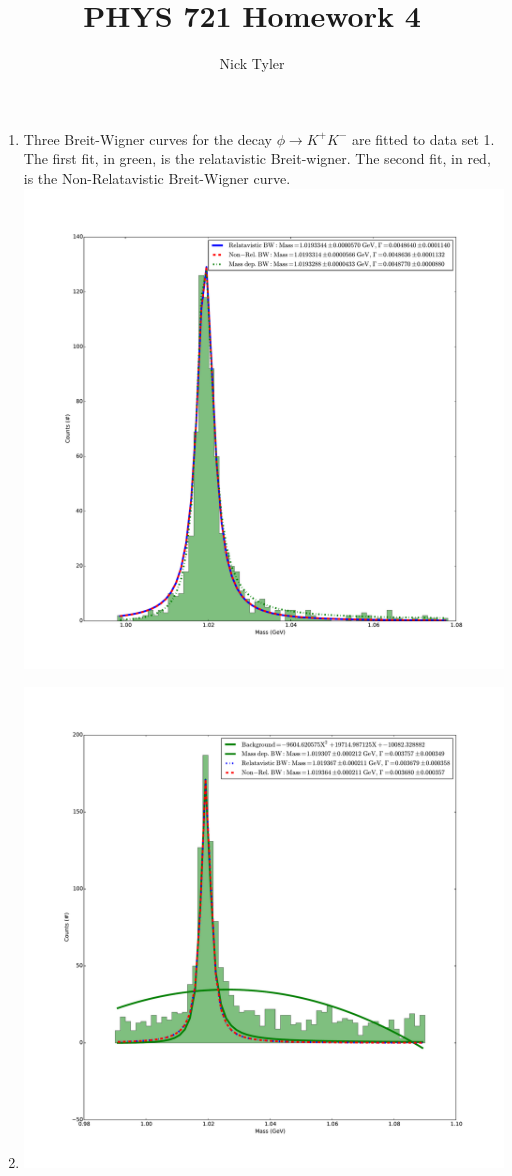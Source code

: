 \documentclass[pdftex]{article}
\title{PHYS 721 Homework 4}
\author{Nick Tyler}
\date{}
\begin{document}
\maketitle
\begin{enumerate}
	\item Three Breit-Wigner curves for the decay $\phi \rightarrow K^{+} K^{- }$ are fitted to data set 1. 
		The first fit, in green, is the relatavistic Breit-wigner. The second fit, in red, is the Non-Relatavistic
		Breit-Wigner curve. \\
		\noindent \includegraphics[scale=0.35]{Problem_1.pdf}\\

	\item 
		\noindent \includegraphics[scale=0.35]{Problem_3.pdf}\\

\end{enumerate}
\end{document}
